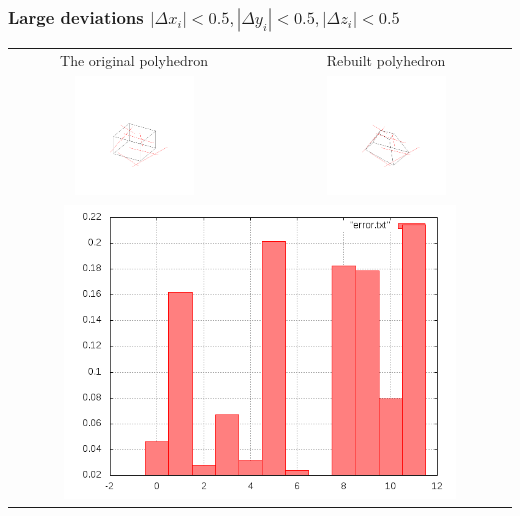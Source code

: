 \documentclass[11pt,fleqn,a4paper]{scrartcl}
\begin{document}
\subsubsection{Large deviations $|\Delta x_{i}|<0.5,|\Delta y_{i}|<0.5,|\Delta z_{i}|<0.5$}
\begin{center}

\begin{tabular}{|c|c|}
\hline
The original polyhedron& Rebuilt polyhedron \\
\includegraphics[width=0.5\textwidth]{variant2/images/11/input.png} &
\includegraphics[width=0.5\textwidth]{variant2/images/11/out.png} \\
\midrule
\multicolumn{2}{|c|}{ \includegraphics[width=0.8\textwidth]{variant2/images/11/error.png}} \\
\hline
\end{tabular}
\end{center}
\end{document}
